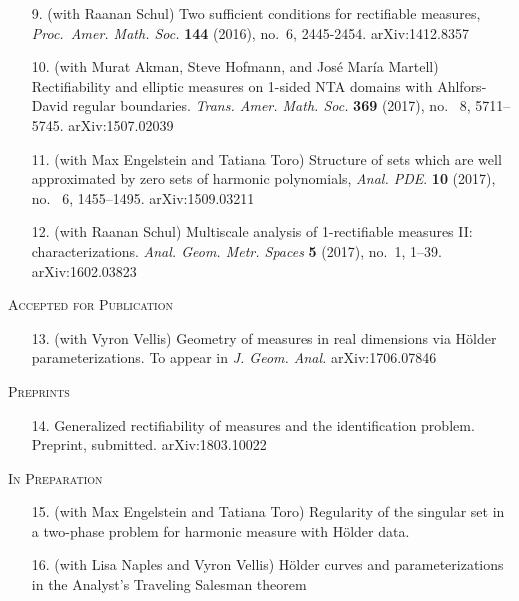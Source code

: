 \documentclass[12pt]{amsart}
\begin{document}
\begin{enumerate}
\item[9.] (with Raanan Schul) Two sufficient conditions for rectifiable measures, \emph{Proc.~Amer. Math. Soc.} \textbf{144} (2016), no.~6, 2445-2454. \textsf{arXiv:1412.8357}
\item[10.] (with Murat Akman, Steve Hofmann, and Jos\'e Mar\'ia Martell) Rectifiability and elliptic measures on 1-sided NTA domains with Ahlfors-David regular boundaries. \emph{Trans. Amer. Math. Soc.} \textbf{369} (2017), no.~ 8, 5711--5745. \textsf{arXiv:1507.02039}
\item[11.] (with Max Engelstein and Tatiana Toro) Structure of sets which are well approximated by zero sets of harmonic polynomials, \emph{Anal. PDE}. \textbf{10} (2017), no.~ 6, 1455--1495.  \textsf{arXiv:1509.03211}
\item[12.] (with Raanan Schul) Multiscale analysis of 1-rectifiable measures II: characterizations. \emph{Anal. Geom. Metr. Spaces} \textbf{5} (2017), no.~1, 1--39. \textsf{arXiv:1602.03823}
\end{enumerate}\vspace{.1cm}

\textsc{Accepted for Publication}
\begin{enumerate}
\item[13.] (with Vyron Vellis) Geometry of measures in real dimensions via H\"older parameterizations. To appear in \emph{J. Geom. Anal.} \textsf{arXiv:1706.07846}
\end{enumerate}\vspace{.1cm}

\textsc{Preprints}
\begin{enumerate}
\item[14.] Generalized rectifiability of measures and the identification problem. Preprint, submitted. \textsf{arXiv:1803.10022}
\end{enumerate}\vspace{.1cm}

\textsc{In Preparation}

\begin{enumerate}
\item[15.] (with Max Engelstein and Tatiana Toro) Regularity of the singular set in a two-phase problem for harmonic measure with H\"older data.
\item[16.] (with Lisa Naples and Vyron Vellis) H\"older curves and parameterizations in the Analyst's Traveling Salesman theorem
\end{enumerate}
\end{document}
